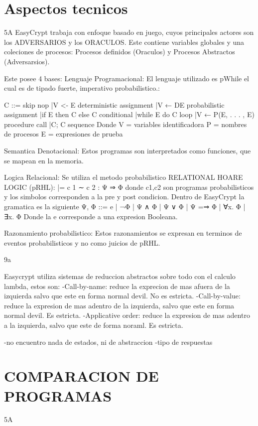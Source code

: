 \documentclass[runningheads,a4paper]{llncs}
\begin{document}
\section{Aspectos tecnicos}
5A
EasyCrypt trabaja con enfoque basado en juego, cuyos principales actores son los ADVERSARIOS y los ORACULOS. Este contiene variables globales y una coleciones de procesos: Procesos definidos (Oraculos) y Procesos Abstractos (Adversarsios).

Este posee 4 bases:
Lenguaje Programacional:
El lenguaje utilizado es pWhile el cual es de tipado fuerte, imperativo probabilistico.:

C ::= skip					nop
	|V <- E					deterministic assignment
	|V ← DE					probabilistic assignment
	|if E then C else C		conditional
	|while E do C			loop
	|V ← P(E, . . . , E)	procedure call
	|C; C					sequence
Donde V = {variables identificadora}
	P = {nombres de procesos}
	E = {expresiones de prueba}


Semantica Denotacional:
Estos programas son interpretados como funciones, que se mapean en la memoria.

Logica Relacional:
Se utiliza el metodo probabilistico RELATIONAL HOARE LOGIC (pRHL):
|= c 1 ∼ c 2 : Ψ ⇒ Φ	donde c1,c2 son programas probabilisticos y los simbolos corresponden a la pre y post condicion.
Dentro de EasyCrypt la gramatica es la siguiente
Ψ, Φ ::= e | ¬Φ | Ψ ∧ Φ | Ψ ∨ Φ | Ψ =⇒ Φ | ∀x. Φ | ∃x. Φ
Donde la e corresponde a una expresion Booleana.

Razonamiento probabilistico:
Estos razonamientos se expresan en terminos de eventos probabilisticos y no como juicios de pRHL.

9a

Easycrypt utiliza sistemas de reduccion abstractos sobre todo con el calculo lambda, estos son:
	-Call-by-name: reduce la exprecion de mas afuera de la izquierda salvo que este en forma normal devil. No es estricta.
	-Call-by-value: reduce la expresion de mas adentro de la izquierda, salvo que este en forma normal devil. Es estricta.
	-Applicative order: reduce la expresion de mas adentro a la izquierda, salvo que este de forma noraml. Es estricta.



-no encuentro nada de estados, ni de abstraccion
-tipo de respuestas


\section{COMPARACION DE PROGRAMAS}
5A
\end{document}
